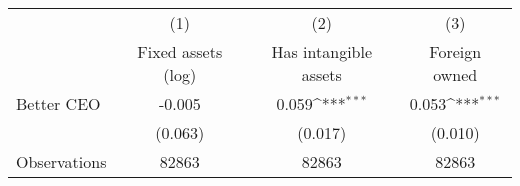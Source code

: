 {
\def\sym#1{\ifmmode^{#1}\else\(^{#1}\)\fi}
\begin{tabular}{l*{3}{c}}
\hline\hline
                    &\multicolumn{1}{c}{(1)}&\multicolumn{1}{c}{(2)}&\multicolumn{1}{c}{(3)}\\
                    &\multicolumn{1}{c}{Fixed assets (log)}&\multicolumn{1}{c}{Has intangible assets}&\multicolumn{1}{c}{Foreign owned}\\
\hline
Better CEO          &      -0.005         &       0.059\sym{***}&       0.053\sym{***}\\
                    &     (0.063)         &     (0.017)         &     (0.010)         \\
\hline
Observations        &       82863         &       82863         &       82863         \\
\hline\hline
\end{tabular}
}
